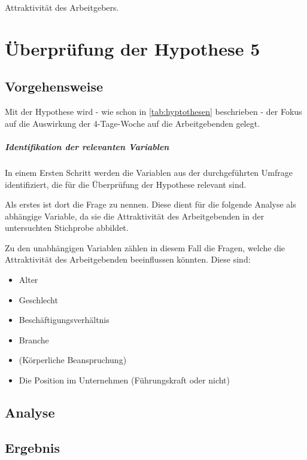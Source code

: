 Attraktivität des Arbeitgebers. 

\chapter{Überprüfung der Hypothese 5}
\label{chap:hypothese5}


\section{Vorgehensweise}
Mit der Hypothese  wird - wie schon in \ref{tab:hyptothesen} beschrieben - der Fokus auf die 
Auswirkung der 4-Tage-Woche auf die Arbeitgebenden gelegt. 

\paragraph{Identifikation der relevanten Variablen}
In einem Ersten Schritt werden die Variablen aus der durchgeführten Umfrage identifiziert, die für die Überprüfung der Hypothese relevant sind.

Als erstes ist dort die Frage  zu nennen. Diese dient für die folgende Analyse als abhängige Variable, da sie die Attraktivität des 
Arbeitgebenden in der untersuchten Stichprobe abbildet.

Zu den unabhängigen Variablen zählen in diesem Fall die Fragen, welche die Attraktivität des Arbeitgebenden beeinflussen könnten. Diese sind:

\begin{itemize}
  \item Alter
  \item Geschlecht
  \item Beschäftigungsverhältnis
  \item Branche
  \item (Körperliche Beanspruchung)
  \item Die Position im Unternehmen (Führungskraft oder nicht)
\end{itemize}


\section{Analyse}

\section{Ergebnis}